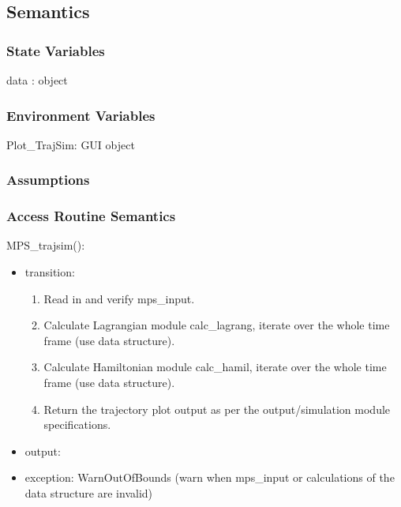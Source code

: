 \documentclass[12pt, titlepage]{article}
\begin{document}
\subsection{Semantics}

\subsubsection{State Variables}

data : object

\subsubsection{Environment Variables}

\noindent Plot{\_}TrajSim: GUI object\\


\subsubsection{Assumptions}


\subsubsection{Access Routine Semantics}

\noindent MPS\_trajsim():
\begin{itemize}
\item transition: 
\begin{enumerate}
\item Read in and verify mps\_input.
\item Calculate Lagrangian module calc\_lagrang, iterate over the whole 
time frame (use data structure).
\item Calculate Hamiltonian module calc\_hamil, iterate over the whole 
time frame (use data structure).
\item Return the trajectory plot output as per the output/simulation module 
specifications.
\end{enumerate}
\item output:  
\item exception: WarnOutOfBounds (warn when mps\_input or calculations of the 
data structure are invalid)  
\end{itemize}
\end{document}
